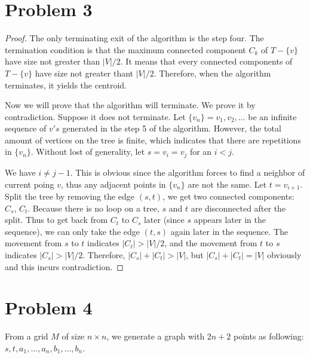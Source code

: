 \documentclass{report}
\begin{document}
    \section*{Problem 3}
    \begin{proof}
    The only terminating exit of the algorithm is the step four. The termination condition
    is that the maximum connected component $C_k$ of $T - \{v\}$ have size not greater 
    than $|V| / 2$. It means that every connected components of $T - \{v\}$ have size 
    not greater thant $|V| / 2$. Therefore, when the algorithm terminates, it yields the 
    centroid.

    Now we will prove that the algorithm will terminate. We prove it by contradiction. 
    Suppose it does not terminate. Let $\{v_n\} = v_1, v_2, \ldots$ be an infinite 
    sequence of $v's$ generated in the step 5 of the algorithm. However, the total 
    amount of vertices on the tree is finite, which indicates that there are repetitions
    in $\{v_n\}$. Without lost of generality, let $s = v_i = v_j$ for an $i < j$. 

    We have $i \neq j - 1$. This is obvious since the algorithm forces to find a neighbor 
    of current poing $v$, thus any adjacent points in $\{v_n\}$ are not the same. Let
    $t = v_{i+1}$. Split the tree by removing the edge $(s, t)$, we get two connected components:
    $C_s$, $C_t$. Because there is no loop on a tree, $s$ and $t$ are disconnected after the split. 
    Thus to 
    get back from $C_t$ to $C_s$ later (since $s$ appears later in the sequence), 
    we can only take the edge $(t, s)$ again later in the sequence.
    The movement from $s$ to $t$ indicates $|C_t| > |V| / 2$, and the 
    movement from $t$ to $s$ indicates $|C_s| > |V| / 2$. Therefore, $|C_s| + |C_t| > |V|$,
    but $|C_s| + |C_t| = |V|$ obviously and this incurs contradiction.
    \end{proof}

    \section*{Problem 4}
    From a grid $M$ of size $n \times n$, we generate a graph with $2n+2$ points as 
    following: $s, t, a_1, \ldots, a_n, b_1, \ldots, b_n$.
\end{document}
